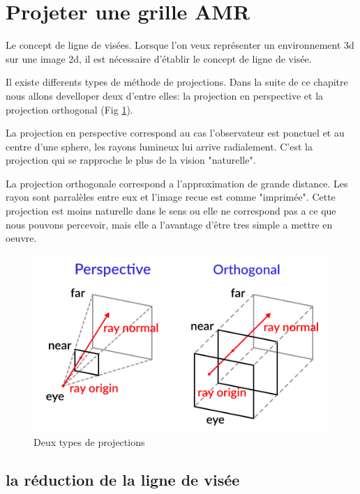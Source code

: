 \section{Projeter une grille AMR}

Le concept de ligne de visées.
Lorsque l'on veux représenter un environnement 3d sur une image 2d, il est nécessaire d'établir le concept de ligne de visée.

Il existe differents types de méthode de projections.
Dans la suite de ce chapitre nous allons develloper deux d'entre elles: la projection en perspective et la projection orthogonal (Fig \ref{fig:raycast_projection}).

La projection en perspective correspond au cas l'observateur est ponctuel et au centre d'une sphere, les rayons lumineux lui arrive radialement.
C'est la projection qui se rapproche le plus de la vision "naturelle".

La projection orthogonale correspond a l'approximation de grande distance.
Les rayon sont parralèles entre eux et l'image recue est comme "imprimée".
Cette projection est moins naturelle dans le sens ou elle ne correspond pas a ce que nous pouvons percevoir, mais elle a l'avantage d'être tres simple a mettre en oeuvre.



\begin{figure}[bth]
        \includegraphics[width=.95\linewidth]{img/04/raycast_projection.png} 
        \caption{Deux types de projections}
 		\label{fig:raycast_projection}
\end{figure}


\subsection{la réduction de la ligne de visée}


